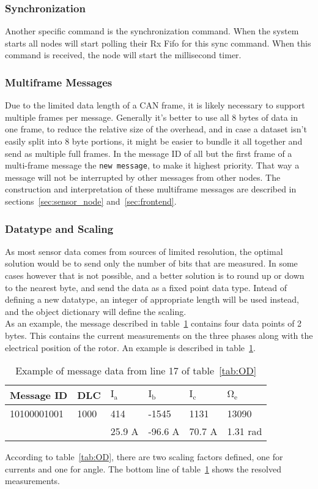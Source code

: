 \subsubsection*{Synchronization}
Another specific command is the synchronization command. 
When the system starts all nodes will start polling their Rx Fifo for this sync command. 
When this command is received, the node will start the millisecond timer.

\subsubsection*{Multiframe Messages}
Due to the limited data length of a CAN frame, it is likely necessary to support multiple frames per message. 
Generally it's better to use all 8 bytes of data in one frame, to reduce the relative size of the overhead, and in case a dataset isn't easily split into 8 byte portions, it might be easier to bundle it all together and send as multiple full frames. 
In the message ID of all but the first frame of a multi-frame message the \texttt{new message}, to make it highest priority.
That way a message will not be interrupted by other messages from other nodes.
The construction and interpretation of these multiframe messages are described in sections~\ref{sec:sensor_node} and~\ref{sec:frontend}.

\subsubsection*{Datatype and Scaling}
As most sensor data comes from sources of limited resolution, the optimal solution would be to send only the number of bits that are measured. 
In some cases however that is not possible, and a better solution is to round up or down to the nearest byte, and send the data as a fixed point data type.
Intead of defining a new datatype, an integer of appropriate length will be used instead, and the object dictionary will define the scaling. \\

As an example, the message described in table~\ref{tab:message17_OD} contains four data points of 2 bytes. 
This contains the current measurements on the three phases along with the electrical position of the rotor.
An example is described in table~\ref{tab:message17_OD}.

\begin{table}
	\centering
	\begin{tabular}{l|l|l|l|l|l}
		Message ID & DLC & $\mathrm{I_a}$ & $\mathrm{I_b}$ & $\mathrm{I_c}$ & $\mathrm{\Omega _e}$ \\ 
		\hline
		10100001001 & 1000 & 414 & -1545 & 1131 & 13090 \\
		\hline
		 & & 25.9 A & -96.6 A & 70.7 A & 1.31 rad
	\end{tabular}
	\caption{Example of message data from line 17 of table~\ref{tab:OD}}
	\label{tab:message17_OD}
\end{table}
According to table~\ref{tab:OD}, there are two scaling factors defined, one for currents and one for angle. 
The bottom line of table~\ref{tab:message17_OD} shows the resolved measurements.
